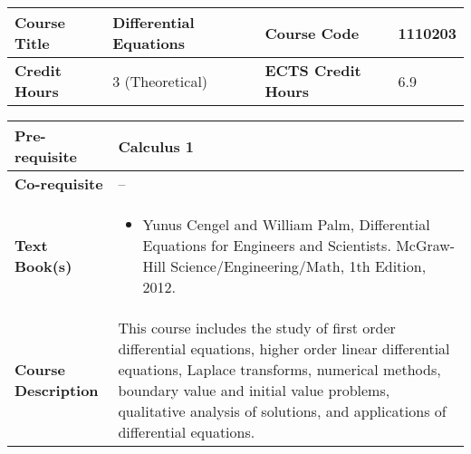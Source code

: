\documentclass[12pt]{article}
\begin{document}
\bigskip
\bigskip



\begin{minipage}{\textwidth}
\begin{tabularx}{\textwidth}{|l|X|l|X|}
\hline
\textbf{Course Title}       &    Differential Equations & \textbf{Course Code}       &  1110203 \\ \hline
\textbf{Credit Hours}       &   3 (Theoretical) & \textbf{ECTS Credit Hours}       &   6.9 \\ \hline
\end{tabularx}

\begin{tabularx}{\textwidth}{|l|X|}
\hline
\textbf{Pre-requisite}      &  Calculus 1 \\ \hline
\textbf{Co-requisite}       &  -- \\ \hline
\textbf{Text Book(s)}      & \begin{minipage}{.70\textwidth}
					\begin{itemize} \itemsep-0.4em
						\vspace{3mm}
						\item Yunus Cengel and William Palm, Differential Equations for Engineers and Scientists. McGraw-Hill Science/Engineering/Math, 1th Edition, 2012.
						\vspace{3mm}
					\end{itemize}
				\end{minipage}  \\ \hline
\textbf{Course Description} & \begin{minipage}{.70\textwidth}
					\vspace{3mm}
					This course includes the study of first order differential equations, higher order linear
					differential equations, Laplace transforms, numerical methods, boundary value and initial value
					problems, qualitative analysis of solutions, and applications of differential equations.

					\vspace{3mm}
					\end{minipage} \\ \hline
\end{tabularx}
\end{minipage}


\bigskip
\bigskip
\end{document}
